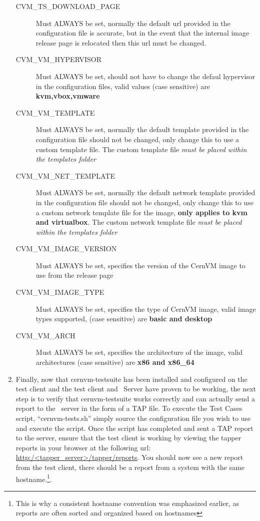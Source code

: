 \begin{enumerate}
\begin{description}
\item[CVM\_TS\_DOWNLOAD\_PAGE]	Must ALWAYS be set, normally the default url provided in the configuration file is accurate, but in the
								event that the internal \cernvm image release page is relocated then this url must be changed.

\item[CVM\_VM\_HYPERVISOR]	Must ALWAYS be set, should not have to change the defaul hypervisor in the configuration files, valid values 
							(case sensitive) are {\bf kvm,vbox,vmware}

\item[CVM\_VM\_TEMPLATE]		Must ALWAYS be set, normally the default template provided in the configuration file should not be changed,
								only change this to use a custom template file. The custom template file \emph{must be placed within the
								templates folder}

\item[CVM\_VM\_NET\_TEMPLATE]	Must ALWAYS be set, normally the default network template provided in the configuration file should not be
	 							changed, only change this to use a custom network template file for the \cernvm image,  {\bf only applies to kvm
	 							and virtualbox}. The custom network template file \emph{must be placed within the templates folder}

\item[CVM\_VM\_IMAGE\_VERSION]	Must ALWAYS be set, specifies the version of the CernVM image to use from the release page
	
\item[CVM\_VM\_IMAGE\_TYPE]		Must ALWAYS be set,  specifies the type of CernVM image, valid image types supported, (case sensitive) are 
								{\bf basic and desktop}

\item[CVM\_VM\_ARCH]		Must ALWAYS be set, specifies the architecture of the \cernvm image, valid architectures (case sensitive) are {\bf 
							x86 and x86\_64}
\end{description}	

\item	Finally, now that cernvm-testsuite has been installed and configured on the test client and the test client and \tapper~Server
			have proven to be working, the next step is to verify that cernvm-testsuite works correctly and can actually send a report to 	
			the \tapper~server in the form of a TAP file. To execute the \cernvm Test Cases script, ``cernvm-tests.sh'' simply source
			the configuration file you wish to use and execute the script. Once the script has completed and sent a TAP report to the server, 
			ensure that the test client is working by viewing the tapper reports in your browser at the  following 
			url: \url{http:/<tapper\_server>/tapper/reports}. You should now see a new report from the test client, there should be a 
			report from a system with the same hostname.\footnote{This is why a consistent hostname convention was emphasized earlier, as 
			reports are often sorted and organized based on hostnames}.


\end{enumerate}

